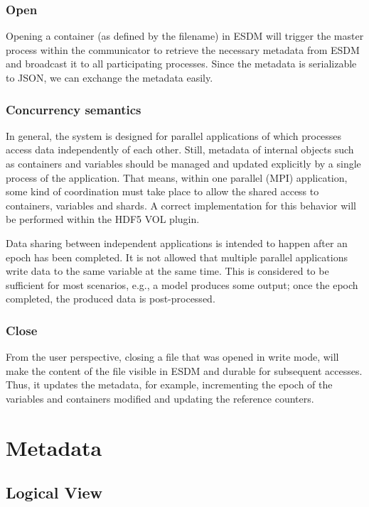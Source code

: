\subsection{Open}

Opening a container (as defined by the filename) in ESDM will trigger the master process within the communicator to retrieve the necessary metadata from ESDM and broadcast it to all participating processes.
Since the metadata is serializable to JSON, we can exchange the metadata easily.

\subsection{Concurrency semantics}

In general, the system is designed for parallel applications of which processes access data independently of each other.
Still, metadata of internal objects such as containers and variables should be managed and updated explicitly by a single process of the application.
That means, within one parallel (MPI) application, some kind of coordination must take place to allow the shared access to containers, variables and shards.
A correct implementation for this behavior will be performed within the HDF5 VOL plugin.

Data sharing between independent applications is intended to happen after an epoch has been completed.
It is not allowed that multiple parallel applications write data to the same variable at the same time.
This is considered to be sufficient for most scenarios, e.g., a model produces some output; once the epoch  completed, the produced data is post-processed.

\subsection{Close}

From the user perspective, closing a file that was opened in write mode, will make the content of the file visible in ESDM and durable for subsequent accesses.
Thus, it updates the metadata, for example, incrementing the epoch of the variables and containers modified and updating the reference counters.

\chapter{Metadata}

\section{Logical View}
\label{backend: mongo/logical}

